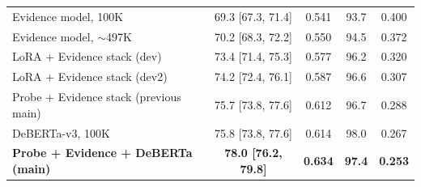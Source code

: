 \begin{table}[htbp]
{\begin{tabular}{lcccc}
Evidence model, 100K                 & 69.3 [67.3, 71.4] & 0.541 & 93.7 & 0.400 \\
Evidence model, $\sim$497K         & 70.2 [68.3, 72.2] & 0.550 & 94.5 & 0.372 \\
LoRA + Evidence stack (dev)            & 73.4 [71.4, 75.3] & 0.577 & 96.2 & 0.320 \\
LoRA + Evidence stack (dev2)           & 74.2 [72.4, 76.1] & 0.587 & 96.6 & 0.307 \\
Probe + Evidence stack (previous main) & 75.7 [73.8, 77.6] & 0.612 & 96.7 & 0.288 \\
DeBERTa-v3, 100K                    & 75.8 [73.8, 77.6] & 0.614 & 98.0 & 0.267 \\
\textbf{Probe + Evidence + DeBERTa (main)} & \textbf{78.0 [76.2, 79.8]} & \textbf{0.634} & \textbf{97.4} & \textbf{0.253} \\
\bottomrule
\end{tabular}}
\end{table}

\begin{table}[htbp]
\centering
\caption{Paired comparisons for the main stack (exact-accuracy difference in points, exact McNemar $p$, and Holm-adjusted $p$ over these 12 comparisons).}
\label{tab:e23paired}
\small
{}
\end{table}


